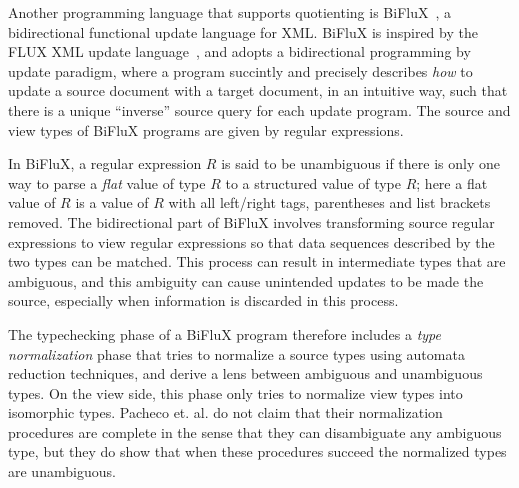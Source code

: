 \documentclass[acmsmall,screen]{acmart}
\begin{document}
Another programming language that supports quotienting is BiFluX~\cite{pacheco2014biflux}, a
bidirectional functional update language for XML. BiFluX is inspired by
the FLUX XML update language~\cite{cheney2008flux}, and adopts a bidirectional
programming by update paradigm, where a program succintly and precisely
describes {\em how} to update a source document with a target document, in an
intuitive way, such that there is a unique ``inverse'' source query for each
update program. The source and view types of BiFluX programs are given by
regular expressions.

In BiFluX, a regular expression $R$ is said to be unambiguous if there is only
one way to parse a {\em flat} value of type $R$ to a structured value of type
$R$; here a flat value of $R$ is a value of $R$ with all left/right tags,
parentheses and list brackets removed. The bidirectional part of BiFluX involves
transforming source regular expressions to view regular expressions so that
data sequences described by the two types can be matched. This process can
result in intermediate types that are ambiguous, and this ambiguity can cause
unintended updates to be made the source, especially when information is
discarded in this process.

The typechecking phase of a BiFluX program therefore includes a {\em type
normalization} phase that tries to normalize a source types using automata
reduction techniques, and derive a lens between ambiguous and unambiguous
types. On the view side, this phase only tries to normalize view types into
isomorphic types. Pacheco et. al. do not claim that their normalization
procedures are complete in the sense that they can disambiguate any ambiguous
type, but they do show that when these procedures succeed the normalized types
are unambiguous.
\end{document}
